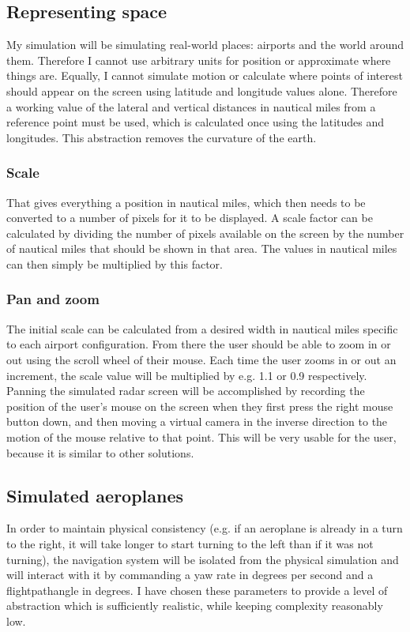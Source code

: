 \documentclass{article}
\begin{document}
\subsection{Representing space}
My simulation will be simulating real-world places: airports and the world around them.
Therefore I cannot use arbitrary units for position or approximate where things are.
Equally, I cannot simulate motion or calculate where points of interest should appear on the screen using latitude and longitude values alone.
Therefore a working value of the lateral and vertical distances in nautical miles from a reference point must be used, which is calculated once using the latitudes and longitudes.
This abstraction removes the curvature of the earth.

\subsubsection{Scale}
That gives everything a position in nautical miles, which then needs to be converted to a number of pixels for it to be displayed.
A scale factor can be calculated by dividing the number of pixels available on the screen by the number of nautical miles that should be shown in that area.
The values in nautical miles can then simply be multiplied by this factor.

\subsubsection{Pan and zoom}
The initial scale can be calculated from a desired width in nautical miles specific to each airport configuration.
From there the user should be able to zoom in or out using the scroll wheel of their mouse.
Each time the user zooms in or out an increment, the scale value will be multiplied by e.g. 1.1 or 0.9 respectively.
Panning the simulated radar screen will be accomplished by recording the position of the user's mouse on the screen when they first press the right mouse button down, and then moving a virtual camera in the inverse direction to the motion of the mouse relative to that point.
This will be very usable for the user, because it is similar to other solutions.

\subsection{Simulated aeroplanes}
In order to maintain physical consistency (e.g. if an aeroplane is already in a turn to the right, it will take longer to start turning to the left than if it was not turning), the navigation system will be isolated from the physical simulation and will interact with it by commanding a yaw rate in degrees per second and a \gls{flightpathangle} in degrees.
I have chosen these parameters to provide a level of abstraction which is sufficiently realistic, while keeping complexity reasonably low.
\end{document}
